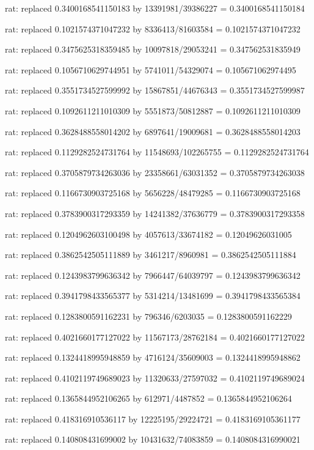 \documentclass[a4paper,10pt]{article}
\begin{document}
\begin{eulernotebook}
\begin{eulercomment}
\begin{eulercomment}
\begin{eulercomment}
\begin{eulercomment}
\begin{eulercomment}
\begin{eulercomment}
\begin{eulercomment}
\begin{eulercomment}
\begin{eulercomment}
\begin{eulercomment}
\begin{eulercomment}
\begin{eulercomment}
\begin{eulercomment}
\begin{eulercomment}
\begin{eulercomment}
\begin{eulercomment}
\begin{euleroutput}
  rat: replaced 0.3400168541150183 by 13391981/39386227 = 0.3400168541150184
  
  rat: replaced 0.1021574371047232 by 8336413/81603584 = 0.1021574371047232
  
  rat: replaced 0.3475625318359485 by 10097818/29053241 = 0.347562531835949
  
  rat: replaced 0.1056710629744951 by 5741011/54329074 = 0.105671062974495
  
  rat: replaced 0.3551734527599992 by 15867851/44676343 = 0.3551734527599987
  
  rat: replaced 0.1092611211010309 by 5551873/50812887 = 0.1092611211010309
  
  rat: replaced 0.3628488558014202 by 6897641/19009681 = 0.3628488558014203
  
  rat: replaced 0.1129282524731764 by 11548693/102265755 = 0.1129282524731764
  
  rat: replaced 0.3705879734263036 by 23358661/63031352 = 0.3705879734263038
  
  rat: replaced 0.1166730903725168 by 5656228/48479285 = 0.1166730903725168
  
  rat: replaced 0.3783900317293359 by 14241382/37636779 = 0.3783900317293358
  
  rat: replaced 0.1204962603100498 by 4057613/33674182 = 0.12049626031005
  
  rat: replaced 0.3862542505111889 by 3461217/8960981 = 0.3862542505111884
  
  rat: replaced 0.1243983799636342 by 7966447/64039797 = 0.1243983799636342
  
  rat: replaced 0.3941798433565377 by 5314214/13481699 = 0.3941798433565384
  
  rat: replaced 0.1283800591162231 by 796346/6203035 = 0.1283800591162229
  
  rat: replaced 0.4021660177127022 by 11567173/28762184 = 0.4021660177127022
  
  rat: replaced 0.1324418995948859 by 4716124/35609003 = 0.1324418995948862
  
  rat: replaced 0.4102119749689023 by 11320633/27597032 = 0.4102119749689024
  
  rat: replaced 0.1365844952106265 by 612971/4487852 = 0.1365844952106264
  
  rat: replaced 0.418316910536117 by 12225195/29224721 = 0.4183169105361177
  
  rat: replaced 0.140808431699002 by 10431632/74083859 = 0.1408084316990021
  

\end{euleroutput}
\end{eulercomment}
\end{eulercomment}
\end{eulercomment}
\end{eulercomment}
\end{eulercomment}
\end{eulercomment}
\end{eulercomment}
\end{eulercomment}
\end{eulercomment}
\end{eulercomment}
\end{eulercomment}
\end{eulercomment}
\end{eulercomment}
\end{eulercomment}
\end{eulercomment}
\end{eulercomment}
\end{eulernotebook}
\end{document}
